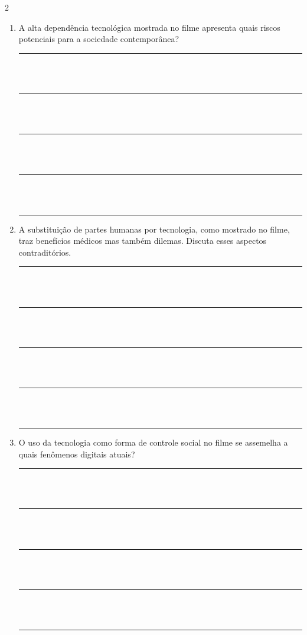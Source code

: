 \documentclass[11pt]{article}
\begin{document}
\begin{multicols}{2}
\begin{enumerate}[leftmargin=*, label=\arabic*., series=questoes]
\item A alta dependência tecnológica mostrada no filme apresenta quais riscos potenciais para a sociedade contemporânea?

\vspace{0.5cm}
\noindent\rule{\linewidth}{0.4pt}\\
\vspace{0.1cm}\\
\noindent\rule{\linewidth}{0.4pt}\\
\vspace{0.1cm}\\
\noindent\rule{\linewidth}{0.4pt}\\
\vspace{0.1cm}\\
\noindent\rule{\linewidth}{0.4pt}\\
\vspace{0.1cm}\\
\noindent\rule{\linewidth}{0.4pt}

\item A substituição de partes humanas por tecnologia, como mostrado no filme, traz benefícios médicos mas também dilemas. Discuta esses aspectos contraditórios.

\vspace{0.5cm}
\noindent\rule{\linewidth}{0.4pt}\\
\vspace{0.1cm}\\
\noindent\rule{\linewidth}{0.4pt}\\
\vspace{0.1cm}\\
\noindent\rule{\linewidth}{0.4pt}\\
\vspace{0.1cm}\\
\noindent\rule{\linewidth}{0.4pt}\\
\vspace{0.1cm}\\
\noindent\rule{\linewidth}{0.4pt}

\item O uso da tecnologia como forma de controle social no filme se assemelha a quais fenômenos digitais atuais?

\vspace{0.5cm}
\noindent\rule{\linewidth}{0.4pt}\\
\vspace{0.1cm}\\
\noindent\rule{\linewidth}{0.4pt}\\
\vspace{0.1cm}\\
\noindent\rule{\linewidth}{0.4pt}\\
\vspace{0.1cm}\\
\noindent\rule{\linewidth}{0.4pt}\\
\vspace{0.1cm}\\
\noindent\rule{\linewidth}{0.4pt}


\end{enumerate}
\end{multicols}
\end{document}
